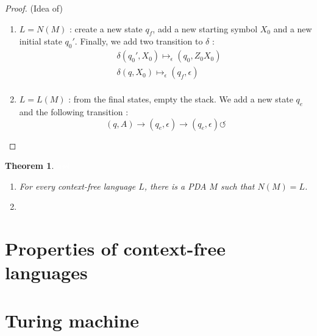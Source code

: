 \documentclass[a4paper,11pt]{article}
\newcommand{\white}[1]{{\textcolor{white}{#1}}}
\newtheorem{thm}{Theorem}[section]
\begin{document}
\begin{proof}(Idea of)

  \begin{enumerate}
  \item $L = N(M)$ : create a new state $q_f$, add a new starting symbol $X_0$
    and a new initial state $q_0'$. Finally, we add two transition to $\delta$ :
    \begin{align*}
      & \delta(q_0',X_0) \mapsto_{\epsilon} (q_0,Z_0X_0) \\
      & \delta(q,X_0) \mapsto_{\epsilon} (q_f,\epsilon) \\
    \end{align*}
  \item $L = L(M)$ : from the final states, empty the stack. We add a new state
    $q_e$ and the following transition :
    \[
      (q,A) \to (q_e,\epsilon) \to (q_e,\epsilon) \circlearrowleft
    \]
  \end{enumerate}
\end{proof}

\begin{thm}
  \white{asd}

  \begin{enumerate}
  \item For every context-free language $L$, there is a PDA $M$ such that $N(M)
    = L$.
  \item 
  \end{enumerate}
\end{thm}

\section{Properties of context-free languages}

\section{Turing machine}
\end{document}
